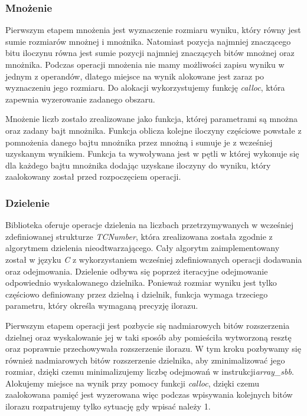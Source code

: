 \documentclass{article}
\begin{document}
\subsubsection{Mnożenie}

Pierwszym etapem mnożenia jest wyznaczenie rozmiaru wyniku, który równy jest sumie rozmiarów mnożnej i mnożnika. Natomiast pozycja najmniej znaczącego bitu iloczynu równa jest sumie pozycji najmniej znaczących bitów mnożnej oraz mnożnika. Podczas operacji mnożenia nie mamy możliwości zapisu wyniku w jednym z operandów, dlatego miejsce na wynik alokowane jest zaraz po wyznaczeniu jego rozmiaru. Do alokacji wykorzystujemy funkcję \textit{calloc}, która zapewnia wyzerowanie zadanego obszaru.

Mnożenie liczb zostało zrealizowane jako funkcja, której parametrami są mnożna oraz zadany bajt mnożnika. Funkcja oblicza kolejne iloczyny częściowe powstałe z pomnożenia danego bajtu mnożnika przez mnożną i sumuje je z wcześniej uzyskanym wynikiem. Funkcja ta wywoływana jest w pętli w której wykonuje się dla każdego bajtu mnożnika dodając uzyskane iloczyny do wyniku, który zaalokowany został przed rozpoczęciem operacji.

\subsubsection{Dzielenie}

Biblioteka oferuje operacje dzielenia na liczbach przetrzymywanych w wcześniej zdefiniowanej strukturze \textit{TCNumber}, która zrealizowana została zgodnie z algorytmem dzielenia nieodtwarzającego. Cały algorytm zaimplementowany został w języku \textit{C} z wykorzystaniem wcześniej zdefiniowanych operacji dodawania oraz odejmowania. Dzielenie odbywa się poprzeż iteracyjne odejmowanie odpowiednio wyskalowanego dzielnika. Ponieważ rozmiar wyniku jest tylko częściowo definiowany przez dzielną i dzielnik, funkcja wymaga trzeciego parametru, który określa wymaganą precyzję ilorazu.

Pierwszym etapem operacji jest pozbycie się nadmiarowych bitów rozszerzenia dzielnej oraz wyskalowanie jej w taki sposób aby pomieściła wytworzoną resztę oraz poprawnie przechowywała rozszerzenie ilorazu. W tym kroku pozbywamy się również nadmiarowych bitów rozszerzenie dzielnika, aby zminimalizować jego rozmiar, dzięki czemu minimalizujemy liczbę odejmowań w instrukcji\linebreak \textit{array\_sbb}. Alokujemy miejsce na wynik przy pomocy funkcji \textit{calloc}, dzięki czemu zaalokowana pamięć jest wyzerowana więc podczas wpisywania kolejnych bitów ilorazu rozpatrujemy tylko sytuację gdy wpisać należy 1.
\end{document}
